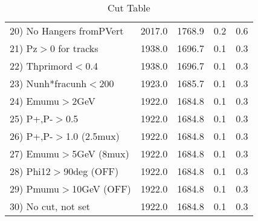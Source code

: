 \begin{table}[h!]
\begin{tabular}{||l||r|r|r|r||}
 20) No Hangers fromPVert &      2017.0 &      1768.9 &         0.2 &         0.6 \\
 21) Pz$>$0 for tracks    &      1938.0 &      1696.7 &         0.1 &         0.3 \\
 22) Thprimord$<$0.4      &      1938.0 &      1696.7 &         0.1 &         0.3 \\
 23) Nunh*fracunh$<$200   &      1923.0 &      1685.7 &         0.1 &         0.3 \\
 24) Emumu$>$2GeV         &      1922.0 &      1684.8 &         0.1 &         0.3 \\
 25) P+,P-$>$0.5          &      1922.0 &      1684.8 &         0.1 &         0.3 \\
 26) P+,P-$>$1.0 (2.5mux) &      1922.0 &      1684.8 &         0.1 &         0.3 \\
 27) Emumu$>$5GeV  (8mux) &      1922.0 &      1684.8 &         0.1 &         0.3 \\
 28) Phi12$>$90deg  (OFF) &      1922.0 &      1684.8 &         0.1 &         0.3 \\
 29) Pmumu$>$10GeV  (OFF) &      1922.0 &      1684.8 &         0.1 &         0.3 \\
 30) No cut, not set      &      1922.0 &      1684.8 &         0.1 &         0.3 \\
 \hline
 \hline
 \end{tabular}
 \caption{Cut Table \cohjp  }
 \label{tab-cut__jpsi}
 \end{table}
